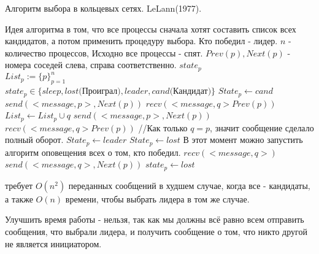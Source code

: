 \begin{algorithm}
	\caption{Алгоритм выбора в кольцевых сетях. LeLann(1977).}
	\label{algLeLann}
	\begin{algorithmic}
		\State Идея алгоритма в том, что все процессы сначала хотят составить список всех кандидатов, а потом применить процедуру выбора. Кто победил - лидер. 
		\Require $n$ - количество процессов, Исходно все процессы - спят. $Prev(p), Next(p)$ - номера соседей слева, справа соответственно.
		\Ensure $state_p$\\
		$List_p:=\{p\}_{p=1}^n$ \\ 
		$state_p \in \{sleep, lost\text{(Проиграл)}, leader, cand\text{(Кандидат)}\}$ 
		 
		\State $State_p \gets cand$
		\State $send(<message, p>, Next(p))$ 
		\State $recv(<message, q> Prev(p))$ 
		 
		\State $List_p \gets List_p \cup {q}$
		\State $send(<message, p>, Next(p))$ 
		\State $recv(<message, q> Prev(p))$ 
		\State //Как только $q = p$, значит сообщение сделало полный оборот.
		\EndWhile
		 
		\State $State_p \gets leader$
		\Else 
		\State $State_p \gets lost$
		\EndIf
		\State В этот момент можно запустить алгоритм оповещения всех о том, кто победил.
		\Else[Не инициаторы] 
		\State $recv(<message, q>)$ 
		\State $send(<message, q>, Next(p))$ 
		\State $state_p \gets lost$
		\EndIf
		\EndWhile
		\EndIf 
	\end{algorithmic}
\end{algorithm}
 требует $O(n^2)$ переданных сообщений в худшем случае, когда все - кандидаты, а также $O(n)$ времени, чтобы выбрать лидера в том же случае.

Улучшить время работы - нельзя, так как мы должны всё равно всем отправить сообщения, что выбрали лидера, и получить сообщение о том, что никто другой не является инициатором.

